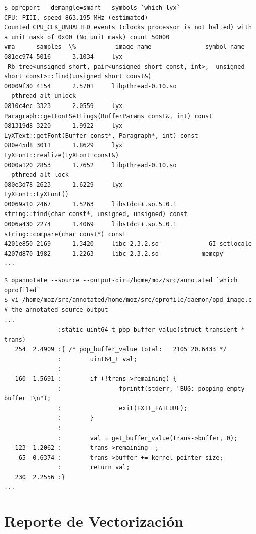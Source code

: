\documentclass[a4paper]{report}
\begin{document}
{\small
\begin{verbatim}
$ opreport --demangle=smart --symbols `which lyx`
CPU: PIII, speed 863.195 MHz (estimated)
Counted CPU_CLK_UNHALTED events (clocks processor is not halted) with a unit mask of 0x00 (No unit mask) count 50000
vma      samples  \%           image name               symbol name
081ec974 5016      3.1034     lyx                      _Rb_tree<unsigned short, pair<unsigned short const, int>,  unsigned short const>::find(unsigned short const&)
00009f30 4154      2.5701     libpthread-0.10.so       __pthread_alt_unlock
0810c4ec 3323      2.0559     lyx                      Paragraph::getFontSettings(BufferParams const&, int) const
081319d8 3220      1.9922     lyx                      LyXText::getFont(Buffer const*, Paragraph*, int) const
080e45d8 3011      1.8629     lyx                      LyXFont::realize(LyXFont const&)
0000a120 2853      1.7652     libpthread-0.10.so       __pthread_alt_lock
080e3d78 2623      1.6229     lyx                      LyXFont::LyXFont()
00069a10 2467      1.5263     libstdc++.so.5.0.1       string::find(char const*, unsigned, unsigned) const
0006a430 2274      1.4069     libstdc++.so.5.0.1       string::compare(char const*) const
4201e850 2169      1.3420     libc-2.3.2.so            __GI_setlocale
4207d870 1982      1.2263     libc-2.3.2.so            memcpy
...
\end{verbatim}

\begin{verbatim}
$ opannotate --source --output-dir=/home/moz/src/annotated `which oprofiled`
$ vi /home/moz/src/annotated/home/moz/src/oprofile/daemon/opd_image.c # the annotated source output
...
               :static uint64_t pop_buffer_value(struct transient * trans)
   254  2.4909 :{ /* pop_buffer_value total:   2105 20.6433 */
               :        uint64_t val;
               :
   160  1.5691 :        if (!trans->remaining) {
               :                fprintf(stderr, "BUG: popping empty buffer !\n");
               :                exit(EXIT_FAILURE);
               :        }
               :
               :        val = get_buffer_value(trans->buffer, 0);
   123  1.2062 :        trans->remaining--;
    65  0.6374 :        trans->buffer += kernel_pointer_size;
               :        return val;
   230  2.2556 :}
...
\end{verbatim}
}

\section{Reporte de Vectorizaci\'on}
\end{document}
